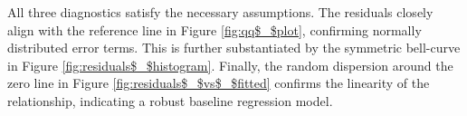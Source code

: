 \documentclass{article}
\begin{document}
All three diagnostics satisfy the necessary assumptions. The residuals closely align with the reference line in Figure \ref{fig:qq$_$plot}, confirming normally distributed error terms. This is further substantiated by the symmetric bell-curve in Figure \ref{fig:residuals$_$histogram}. Finally, the random dispersion around the zero line in Figure \ref{fig:residuals$_$vs$_$fitted} confirms the linearity of the relationship, indicating a robust baseline regression model.
\\
\\
\end{document}
